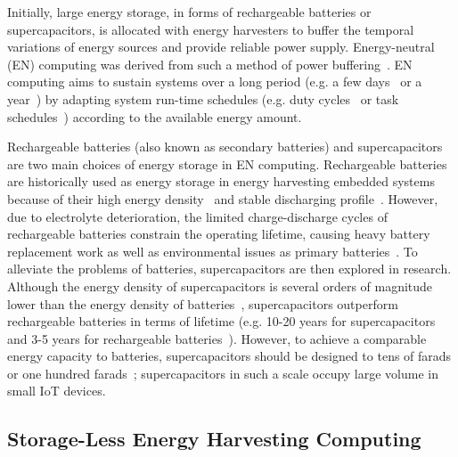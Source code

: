 Initially, large energy storage, in forms of rechargeable batteries or supercapacitors, is allocated with energy harvesters to buffer the temporal variations of energy sources and provide reliable power supply. Energy-neutral (EN) computing was derived from such a method of power buffering~\cite{sudevalayam2011energy}. EN computing aims to sustain systems over a long period (e.g. a few days~\cite{kansal2007power} or a year~\cite{buchli2014dynamic}) by adapting system run-time schedules (e.g. duty cycles~\cite{kansal2007power, buchli2014dynamic, le2012power} or task schedules~\cite{caruso2018dynamic, wagemann2018operating}) according to the available energy amount. 

Rechargeable batteries (also known as secondary batteries) and supercapacitors are two main choices of energy storage in EN computing. Rechargeable batteries are historically used as energy storage in energy harvesting embedded systems because of their high energy density~\cite{akhtar2015energy} and stable discharging profile~\cite{sudevalayam2011energy}. However, due to electrolyte deterioration, the limited charge-discharge cycles of rechargeable batteries constrain the operating lifetime, causing heavy battery replacement work as well as environmental issues as primary batteries~\cite{rakhmatov2002battery}. To alleviate the problems of batteries, supercapacitors are then explored in research. Although the energy density of supercapacitors is several orders of magnitude lower than the energy density of batteries~\cite{merrett2012supercapacitor}, supercapacitors outperform rechargeable batteries in terms of lifetime (e.g. 10-20 years for supercapacitors and 3-5 years for rechargeable batteries~\cite{simjee2008efficient}). However, to achieve a comparable energy capacity to batteries, supercapacitors should be designed to tens of farads or one hundred farads~\cite{jiang2005perpetual, simjee2006everlast}; supercapacitors in such a scale occupy large volume in small IoT devices. 

\subsection{Storage-Less Energy Harvesting Computing}

